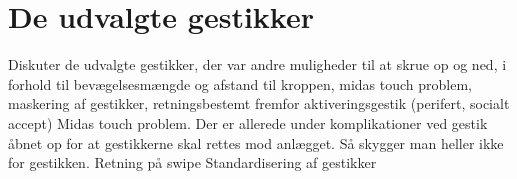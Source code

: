 \section{De udvalgte gestikker}
\label{DiskussionUdvalgteGestikker}
%
Diskuter de udvalgte gestikker, der var andre muligheder til at skrue op og ned, i forhold til bevægelsesmængde og afstand til kroppen, midas touch problem, maskering af gestikker, retningsbestemt fremfor aktiveringsgestik (perifert, socialt accept)\blankline
%
Midas touch problem. Der er allerede under komplikationer ved gestik åbnet op for at gestikkerne skal rettes mod anlægget. Så skygger man heller ikke for gestikken.\blankline
%
Retning på swipe\blankline
%
Standardisering af gestikker
%